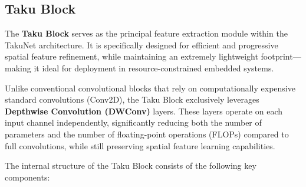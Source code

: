 \subsection{Taku Block}

The \textbf{Taku Block} serves as the principal feature extraction module within the TakuNet architecture. It is specifically designed for efficient and progressive spatial feature refinement, while maintaining an extremely lightweight footprint—making it ideal for deployment in resource-constrained embedded systems.

Unlike conventional convolutional blocks that rely on computationally expensive standard convolutions (Conv2D), the Taku Block exclusively leverages \textbf{Depthwise Convolution (DWConv)} layers. These layers operate on each input channel independently, significantly reducing both the number of parameters and the number of floating-point operations (FLOPs) compared to full convolutions, while still preserving spatial feature learning capabilities.

The internal structure of the Taku Block consists of the following key components:

